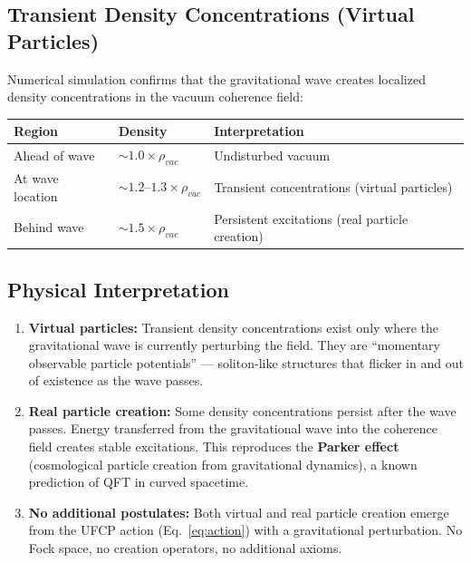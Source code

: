 \documentclass[11pt, a4paper]{article}
\begin{document}
\subsection{Transient Density Concentrations (Virtual Particles)}

Numerical simulation confirms that the gravitational wave creates
localized density concentrations in the vacuum coherence field:

\begin{center}
\begin{tabular}{@{}lll@{}}
\toprule
\textbf{Region} & \textbf{Density} & \textbf{Interpretation} \\
\midrule
Ahead of wave & $\sim 1.0\times\rho_{vac}$ & Undisturbed vacuum \\
At wave location & $\sim 1.2\text{--}1.3\times\rho_{vac}$ &
  Transient concentrations (virtual particles) \\
Behind wave & $\sim 1.5\times\rho_{vac}$ &
  Persistent excitations (real particle creation) \\
\bottomrule
\end{tabular}
\end{center}

\subsection{Physical Interpretation}

\begin{enumerate}[nosep]
  \item \textbf{Virtual particles:} Transient density concentrations
        exist only where the gravitational wave is currently perturbing
        the field. They are ``momentary observable particle potentials''
        --- soliton-like structures that flicker in and out of existence
        as the wave passes.
  \item \textbf{Real particle creation:} Some density concentrations
        persist after the wave passes. Energy transferred from the
        gravitational wave into the coherence field creates stable
        excitations. This reproduces the \textbf{Parker effect}
        (cosmological particle creation from gravitational dynamics),
        a known prediction of QFT in curved spacetime.
  \item \textbf{No additional postulates:} Both virtual and real particle
        creation emerge from the UFCP action (Eq.~\ref{eq:action}) with
        a gravitational perturbation. No Fock space, no creation operators,
        no additional axioms.
\end{enumerate}
\end{document}
